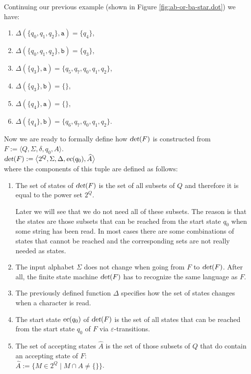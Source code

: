 \exampleEng
Continuing our previous example (shown in Figure \ref{fig:ab-or-ba-star.dot}) we have:
\begin{enumerate}
\item $\Delta(\{q_0, q_1, q_2\}, \texttt{a}) = \{ q_4 \}$,
\item $\Delta(\{q_0, q_1, q_2\}, \texttt{b}) = \{ q_3 \}$,
\item $\Delta(\{ q_3 \}, \texttt{a}) = \{ q_5, q_7, q_0, q_1, q_2 \}$,
\item $\Delta(\{ q_3 \}, \texttt{b}) = \{ \}$,
\item $\Delta(\{ q_4 \}, \texttt{a}) = \{ \}$,
\item $\Delta(\{ q_4 \}, \texttt{b}) = \{ q_6, q_7, q_0, q_1, q_2 \}$.
      \eox
\end{enumerate}
Now we are ready to formally define how $\textsl{det}(F)$ is constructed from $F := \bigl\langle Q, \Sigma, \delta, q_0, A \bigr\rangle$.
\\[0.2cm]
\hspace*{1.3cm}
$\textsl{det}(F) := \bigl\langle 2^Q, \Sigma, \Delta, \textsl{ec}(q_0), \widehat{A} \bigr\rangle$
\\[0.2cm]
where the components of this tuple are defined as follows:
\begin{enumerate}
\item The set of states of $\textsl{det}(F)$ is the set of all subsets of $Q$ and therefore it is equal to the power set
      $2^Q$.

      Later we will see that we do not need all of these subsets.
      The reason is that the states are those subsets that can be reached from the start state $q_0$ 
      when some string has been read.  In most cases there are some combinations of states that cannot be reached
      and the corresponding sets are not really needed as states.
\item The input alphabet $\Sigma$ does not change when going from $F$ to $\textsl{det}(F)$.
      After all, the finite state machine $\textsl{det}(F)$ has to recognize the same language as $F$.
\item The previously defined function $\Delta$ specifies how the set of states changes when a
      character is read.
\item The start state $\textsl{ec}(q_0)$ of $\textsl{det}(F)$ is the set of all states
      that can be reached from the start state $q_0$ of $F$ via $\varepsilon$-transitions.
\item The set of accepting states $\widehat{A}$ is the set of those subsets of $Q$ that do contain an accepting
      state of $F$:
      \\[0.2cm]
      \hspace*{1.3cm}
      $\widehat{A} := \bigl\{ M \in 2^Q \mid M \cap A \not= \{\} \bigr\}$.
\end{enumerate}

